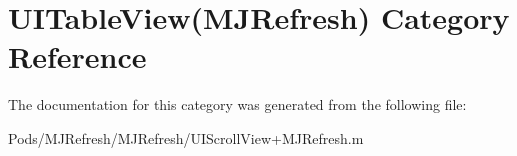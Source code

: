 \hypertarget{category_u_i_table_view_07_m_j_refresh_08}{}\section{U\+I\+Table\+View(M\+J\+Refresh) Category Reference}
\label{category_u_i_table_view_07_m_j_refresh_08}


The documentation for this category was generated from the following file\+:\begin{DoxyCompactItemize}
\item 
Pods/\+M\+J\+Refresh/\+M\+J\+Refresh/U\+I\+Scroll\+View+\+M\+J\+Refresh.\+m\end{DoxyCompactItemize}
